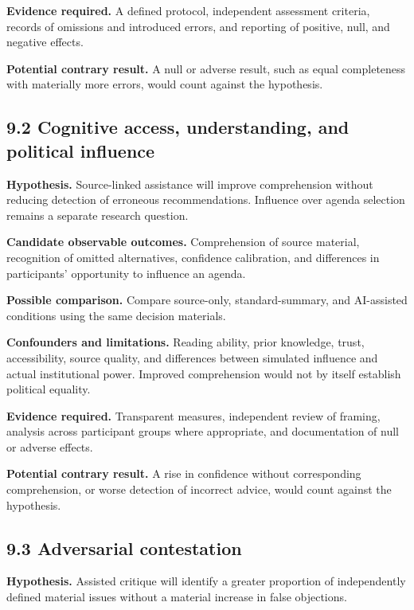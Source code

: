 \documentclass[
  10pt,
]{article}
\begin{document}
\textbf{Evidence required.} A defined protocol, independent assessment
criteria, records of omissions and introduced errors, and reporting of
positive, null, and negative effects.

\textbf{Potential contrary result.} A null or adverse result, such as
equal completeness with materially more errors, would count against the
hypothesis.

\subsection{9.2 Cognitive access, understanding, and political
influence}\label{cognitive-access-understanding-and-political-influence}

\textbf{Hypothesis.} Source-linked assistance will improve comprehension
without reducing detection of erroneous recommendations. Influence over
agenda selection remains a separate research question.

\textbf{Candidate observable outcomes.} Comprehension of source
material, recognition of omitted alternatives, confidence calibration,
and differences in participants' opportunity to influence an agenda.

\textbf{Possible comparison.} Compare source-only, standard-summary, and
AI-assisted conditions using the same decision materials.

\textbf{Confounders and limitations.} Reading ability, prior knowledge,
trust, accessibility, source quality, and differences between simulated
influence and actual institutional power. Improved comprehension would
not by itself establish political equality.

\textbf{Evidence required.} Transparent measures, independent review of
framing, analysis across participant groups where appropriate, and
documentation of null or adverse effects.

\textbf{Potential contrary result.} A rise in confidence without
corresponding comprehension, or worse detection of incorrect advice,
would count against the hypothesis.

\subsection{9.3 Adversarial
contestation}\label{adversarial-contestation}

\textbf{Hypothesis.} Assisted critique will identify a greater
proportion of independently defined material issues without a material
increase in false objections.
\end{document}

